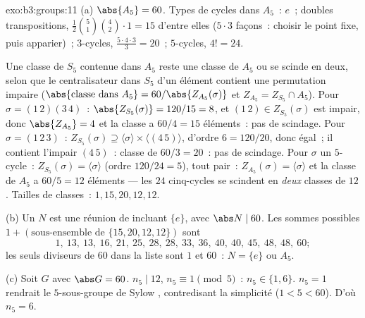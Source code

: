 \begin{solution}{exo:b3:groups:11}
(a) $\abs{A_5} = 60$. Types de cycles dans $A_5$~: $e$~; doubles
transpositions, $\frac{1}{2}\binom{5}{1}\binom{4}{2}\cdot 1 = 15$
d'entre elles ($5 \cdot 3$ façons~: choisir le point fixe, puis
apparier)~; $3$-cycles, $\frac{5 \cdot 4 \cdot 3}{3} = 20$~;
$5$-cycles, $4! = 24$.

Une classe de $S_5$ contenue dans $A_5$ reste une classe de $A_5$
ou se scinde en deux, selon que le centralisateur dans $S_5$ d'un
élément contient une permutation impaire
($\abs{\text{classe dans }A_5} = 60/\abs{Z_{A_5}(\sigma)}$ et
$Z_{A_5} = Z_{S_5} \cap A_5$). Pour $\sigma = (1\,2)(3\,4)$~:
$\abs{Z_{S_5}(\sigma)} = 120/15 = 8$, et $(1\,2) \in
Z_{S_5}(\sigma)$ est impair, donc $\abs{Z_{A_5}} = 4$ et la
classe a $60/4 = 15$ éléments~: pas de scindage. Pour $\sigma =
(1\,2\,3)$~: $Z_{S_5}(\sigma) \supseteq \langle \sigma \rangle
\times \langle (4\,5)\rangle$, d'ordre $6 = 120/20$, donc égal~;
il contient l'impair $(4\,5)$~: classe de $60/3 = 20$~: pas de
scindage. Pour $\sigma$ un $5$-cycle~: $Z_{S_5}(\sigma) =
\langle \sigma\rangle$ (ordre $120/24 = 5$), tout pair~:
$Z_{A_5}(\sigma) = \langle \sigma\rangle$ et la classe de $A_5$
a $60/5 = 12$ éléments --- les $24$ cinq-cycles se scindent en
\emph{deux} classes de $12$. Tailles de classes~: $1, 15, 20,
12, 12$.

(b) Un  $N$ est une réunion de  incluant $\{e\}$, avec $\abs N \mid 60$. Les sommes
possibles $1 + (\text{sous-ensemble de } \{15, 20, 12, 12\})$
sont
\[
1,\ 13,\ 13,\ 16,\ 21,\ 25,\ 28,\ 28,\ 33,\ 36,\ 40,\ 40,\ 45,\
48,\ 48,\ 60 ;
\]
les seuls diviseurs de $60$ dans la liste sont $1$ et $60$~: $N
= \{e\}$ ou $A_5$.

(c) Soit $G$  avec $\abs G = 60$. $n_5 \mid 12$, $n_5
\equiv 1 \pmod 5$~: $n_5 \in \{1, 6\}$. $n_5 = 1$ rendrait le
$5$-sous-groupe de Sylow , contredisant la simplicité ($1 <
5 < 60$). D'où $n_5 = 6$.
\end{solution}

